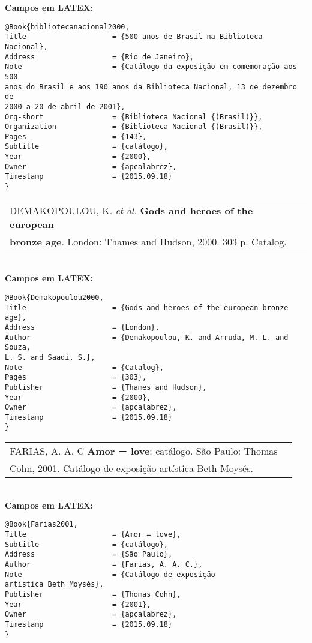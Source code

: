 \textbf{Campos em LATEX:}

\begin{verbatim}
@Book{bibliotecanacional2000,
Title                    = {500 anos de Brasil na Biblioteca Nacional},
Address                  = {Rio de Janeiro},
Note                     = {Catálogo da exposição em comemoração aos 500
anos do Brasil e aos 190 anos da Biblioteca Nacional, 13 de dezembro de
2000 a 20 de abril de 2001},
Org-short                = {Biblioteca Nacional {(Brasil)}},
Organization             = {Biblioteca Nacional {(Brasil)}},
Pages                    = {143},
Subtitle                 = {catálogo},
Year                     = {2000},
Owner                    = {apcalabrez},
Timestamp                = {2015.09.18}
}
\end{verbatim}

\begin{tabular}{|l|c|} \hline
	DEMAKOPOULOU, K. \textit{et al.} \textbf{Gods and heroes of the european}\\ \textbf{bronze age}. London:  Thames and Hudson, 2000. 303 p. Catalog.    \\\hline
\end{tabular}\\

\textbf{Campos em LATEX:}

\begin{verbatim}
@Book{Demakopoulou2000,
Title                    = {Gods and heroes of the european bronze age},
Address                  = {London},
Author                   = {Demakopoulou, K. and Arruda, M. L. and Souza,
L. S. and Saadi, S.},
Note                     = {Catalog},
Pages                    = {303},
Publisher                = {Thames and Hudson},
Year                     = {2000},
Owner                    = {apcalabrez},
Timestamp                = {2015.09.18}
}
\end{verbatim}

\begin{tabular}{|l|c|} \hline
	FARIAS, A. A. C \textbf{Amor = love}: catálogo. São Paulo: Thomas \\ Cohn, 2001. Catálogo de exposição artística Beth Moysés.    \\\hline
\end{tabular}\\

\textbf{Campos em LATEX:}

\begin{verbatim}
@Book{Farias2001,
Title                    = {Amor = love},
Subtitle                 = {catálogo},
Address                  = {São Paulo},
Author                   = {Farias, A. A. C.},
Note                     = {Catálogo de exposição
artística Beth Moysés},
Publisher                = {Thomas Cohn},
Year                     = {2001},
Owner                    = {apcalabrez},
Timestamp                = {2015.09.18}
}
\end{verbatim}

